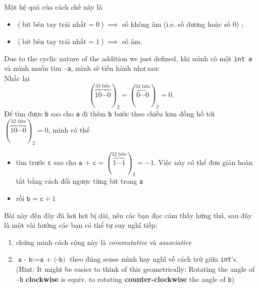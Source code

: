 \documentclass{article}
\newcommand{\bits}[2]{
	(\overbrace{#1}^{\textrm{#2 bits}})_2}
\begin{document}
Một hệ quả của cách chế này là
\begin{itemize}
	\item $(\textrm{bit bên tay trái nhất}=0) \implies$ số không âm (i.e. số dương hoặc số $0$) ;
	\item $(\textrm{bit bên tay trái nhất}=1) \implies$ số âm.
\end{itemize}

Due to the cyclic nature of the addition we just defined, khi mình có một \texttt{int a} và mình muốn tìm \texttt{-a}, mình sẽ tiến hành như sau:\\
Nhắc lại $$(\overbrace{10\cdots0}^{\textrm{33 bits}})_{2} = (\overbrace{0\cdots0}^{\textrm{32 bits}})_{2} = 0.$$
Để tìm được \texttt{b} sao cho \texttt{a} đi thêm \texttt{b} bước theo chiều kim đồng hồ tới $(\overbrace{10\cdots0}^{\textrm{32 bits}})_{2} = 0$, mình có thể
\begin{itemize}
	\item tìm trước \texttt{c} sao cho $\texttt{a + c} = \bits{1\cdots1}{32} = -1$. Việc này có thể đơn giản hoàn tất bằng cách đổi ngược từng bit trong \texttt{a}
	\item rồi $\texttt{b} = \texttt{c} + 1$
\end{itemize}

Bài này đến đây đã hơi hơi bị dài, nếu các bạn đọc cảm thấy hứng thú, sau đây là một vài hướng các bạn có thể tự suy nghĩ tiếp:
\begin{enumerate}
	\item chứng minh cách cộng này là \emph{commutative} và \emph{associative}
	\item $\texttt{a - b} := \texttt{a + (-b)}$ theo đúng sense mình hay nghĩ về cách trừ giữa \texttt{int}'s. (Hint: It might be easier to think of this geometrically: Rotating the angle of \texttt{-b} \textbf{clockwise} is equiv. to rotating \textbf{counter-clockwise} the angle of \texttt{b})
\end{enumerate}
\end{document}
